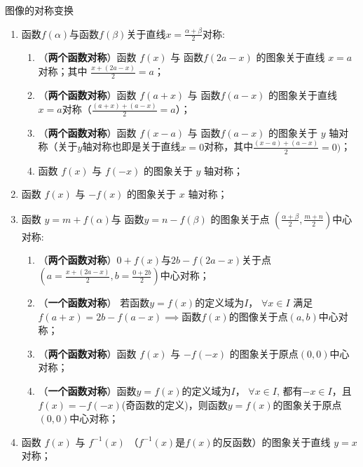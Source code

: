 \begin{conclusion}{图像的对称变换}{}
\begin{enumerate}
\item \vspace{2mm} 函数$f(\alpha)$与函数$f(\beta)$关于直线$\displaystyle x=\frac{\alpha + \beta}{2}$对称:
\begin{enumerate}
\item \vspace{2mm} （\textbf{两个函数对称}）函数 $f(x)$ 与 函数$f(2a-x)$ 的图象关于直线 $x=a$ 对称；其中 $\displaystyle \frac{x+ (2a -x)}{2}= a$；
\item \vspace{2mm} （\textbf{两个函数对称}）函数 $f(a+x)$ 与 函数$f(a-x)$ 的图象关于直线 $x=a$对称（$\displaystyle \frac{(a+x)+(a-x)}{2}=a$）；
\item \vspace{2mm} （\textbf{两个函数对称}）函数 $f(x-a)$ 与 函数$f(a-x)$ 的图象关于 $y$ 轴对称（关于$y$轴对称也即是关于直线$x=0$对称，其中$\displaystyle \frac{(x-a)+(a-x)}{2}= 0 )$；
\item \vspace{2mm} 函数 $f(x)$ 与 $f(-x)$ 的图象关于 $y$ 轴对称；
\end{enumerate}
\item \vspace{2mm} 函数 $f(x)$ 与 $-f(x)$ 的图象关于 $x$ 轴对称；
\item \vspace{2mm} 函数 $y = m + f(\alpha)$与 函数$y = n - f(\beta)$ 的图象关于点 $\displaystyle (\frac{\alpha + \beta}{2}, \frac{m+n}{2})$中心对称:
\begin{enumerate}
\item \vspace{2mm} （\textbf{两个函数对称}）$0+f(x)$与$2b-f(2a-x)$关于点$\displaystyle (a=\frac{x+(2a-x)}{2}, b=\frac{0+2b}{2})$中心对称；
\item \vspace{2mm} （\textbf{一个函数对称}） 若函数$y=f(x)$的定义域为$I$， $\forall x \in I$ 满足 $f(a+x)=2b-f(a-x) \implies$函数$f(x)$的图像关于点$(a, b)$中心对称；
\item \vspace{2mm} （\textbf{两个函数对称}）函数 $f(x)$ 与 $-f(-x)$ 的图象关于原点$\left( 0, 0 \right)$中心对称；
\item \vspace{2mm} （\textbf{一个函数对称}）函数$y=f(x)$的定义域为$I$， $\forall x \in I$, 都有$-x \in I$，且$f(x) = -f(-x)$(奇函数的定义)，则函数$y=f(x)$的图象关于原点$\left( 0, 0 \right)$中心对称；
\end{enumerate}
\item \vspace{2mm} 函数 $f(x)$ 与 $f^{-1}(x)$ （$f^{-1}(x)$是$f(x)$的反函数）的图象关于直线 $y=x$ 对称；
\end{enumerate}
\end{conclusion}

